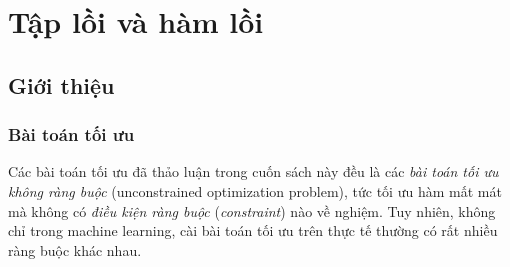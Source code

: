 
\chapter{Tập lồi và hàm lồi}
\label{cha:convexity}
\section{Giới thiệu}
\subsection{Bài toán tối ưu}
Các bài toán tối ưu đã thảo luận trong cuốn sách này đều là các \textit{bài toán
tối ưu không ràng buộc} ({unconstrained optimization problem}), tức tối
ưu hàm mất mát mà không có \textit{điều kiện ràng buộc} (\textit{constraint})
nào về nghiệm. Tuy nhiên, không chỉ trong machine learning, cài bài
toán tối ưu trên thực tế thường có rất nhiều ràng buộc khác nhau.




